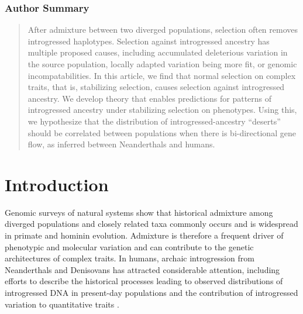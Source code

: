 \documentclass{article}
\begin{document}
\begin{center}
    \subsubsection*{Author Summary}
\end{center}
\small
\begin{quote}

    After admixture between two diverged populations, selection often removes
    introgressed haplotypes. Selection against introgressed ancestry has
    multiple proposed causes, including accumulated deleterious variation in
    the source population, locally adapted variation being more fit, or genomic
    incompatabilities. In this article, we find that normal selection on
    complex traits, that is, stabilizing selection, causes selection against
    introgressed ancestry. We develop theory that enables predictions for
    patterns of introgressed ancestry under stabilizing selection on
    phenotypes. Using this, we hypothesize that the distribution of
    introgressed-ancestry ``deserts'' should be correlated between populations
    when there is bi-directional gene flow, as inferred between Neanderthals
    and humans.

\end{quote}

\normalsize

\onehalfspacing

\section*{Introduction}

Genomic surveys of natural systems show that historical admixture among
diverged populations and closely related taxa commonly occurs
\citep{brandvain2014speciation, skoglund2015ancient, suvorov2022widespread} and
is widespread in primate \citep{tung2017contribution, sorensen2023genome} and
hominin \citep{wolf2018outstanding, peter2020100} evolution. Admixture is
therefore a frequent driver of phenotypic and molecular variation and can
contribute to the genetic architectures of complex traits. In humans, archaic
introgression from Neanderthals and Denisovans has attracted considerable
attention, including efforts to describe the historical processes leading to
observed distributions of introgressed DNA in present-day populations
\citep{prufer2014complete, villanea2019multiple, chen2020identifying} and the
contribution of introgressed variation to quantitative traits
\citep{sankararaman2016combined, wei2023lingering}.
\end{document}
